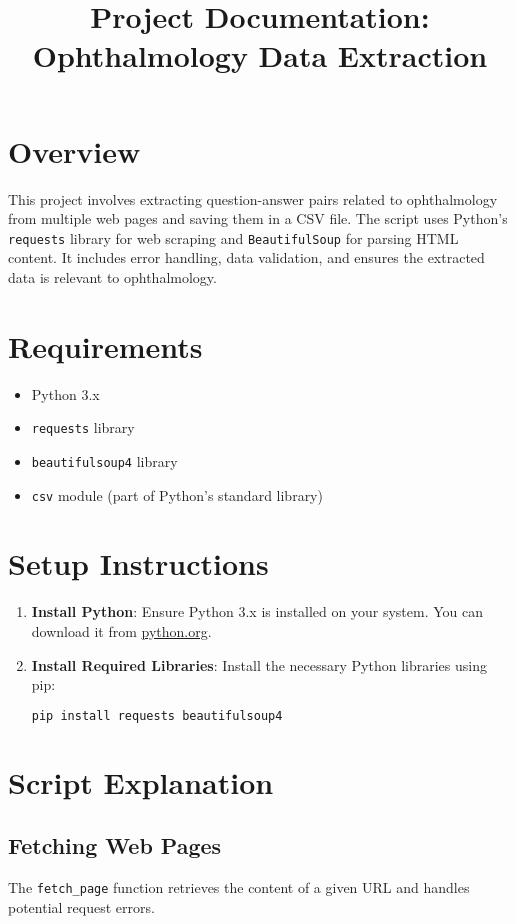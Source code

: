 \documentclass[a4paper,12pt]{article}
\title{Project Documentation: Ophthalmology Data Extraction}
\author{}
\date{}
\begin{document}
\maketitle

\tableofcontents
\newpage

\section{Overview}
This project involves extracting question-answer pairs related to ophthalmology from multiple web pages and saving them in a CSV file. The script uses Python's \texttt{requests} library for web scraping and \texttt{BeautifulSoup} for parsing HTML content. It includes error handling, data validation, and ensures the extracted data is relevant to ophthalmology.

\section{Requirements}
\begin{itemize}
    \item Python 3.x
    \item \texttt{requests} library
    \item \texttt{beautifulsoup4} library
    \item \texttt{csv} module (part of Python's standard library)
\end{itemize}

\section{Setup Instructions}
\begin{enumerate}
    \item \textbf{Install Python}: Ensure Python 3.x is installed on your system. You can download it from \href{https://www.python.org/}{python.org}.
    \item \textbf{Install Required Libraries}: Install the necessary Python libraries using pip:
    \begin{lstlisting}[language=bash]
pip install requests beautifulsoup4
    \end{lstlisting}
\end{enumerate}

\section{Script Explanation}

\subsection{Fetching Web Pages}
The \texttt{fetch\_page} function retrieves the content of a given URL and handles potential request errors.
\end{document}
